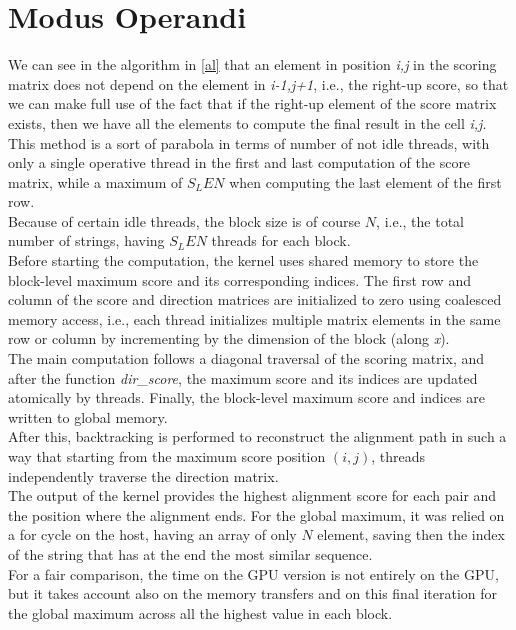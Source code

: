 \documentclass[conference]{IEEEtran}
\begin{document}
	\section{Modus Operandi}
	We can see in the algorithm in \ref{al} that an element in position \textit{i,j} in the scoring matrix does not depend on the element in \textit{i-1,j+1}, i.e., the right-up score, so that we can make full use of the fact that if the right-up element of the score matrix exists, then we have all the elements to compute the final result in the cell \textit{i,j}. This method is a sort of parabola in terms of number of not idle threads, with only a single operative thread in the first and last computation of the score matrix, while a maximum of $S_LEN$ when computing the last element of the first row.\\
	Because of certain idle threads, the block size is of course $N$, i.e., the total number of strings, having $S_LEN$ threads for each block.\\
	Before starting the computation, the kernel uses shared memory to store the block-level maximum score and its corresponding indices. The first row and column of the score and direction matrices are initialized to zero using coalesced memory access, i.e., each thread initializes multiple matrix elements in the same row or column by incrementing by the dimension of the block (along \textit{x}).\\
	The main computation follows a diagonal traversal of the scoring matrix, and after the function \textit{dir\_score}, the maximum score and its indices are updated atomically by threads. Finally, the block-level maximum score and indices are written to global memory.\\
	After this, backtracking is performed to reconstruct the alignment path in such a way that starting from the maximum score position \((i, j)\), threads independently traverse the direction matrix.\\
	The output of the kernel provides the highest alignment score for each pair and the position where the alignment ends. For the global maximum, it was relied on a for cycle on the host, having an array of only $N$ element, saving then the index of the string that has at the end the most similar sequence.\\
	For a fair comparison, the time on the GPU version is not entirely on the GPU, but it takes account also on the memory transfers and on this final iteration for the global maximum across all the highest value in each block.
	
\end{document}
